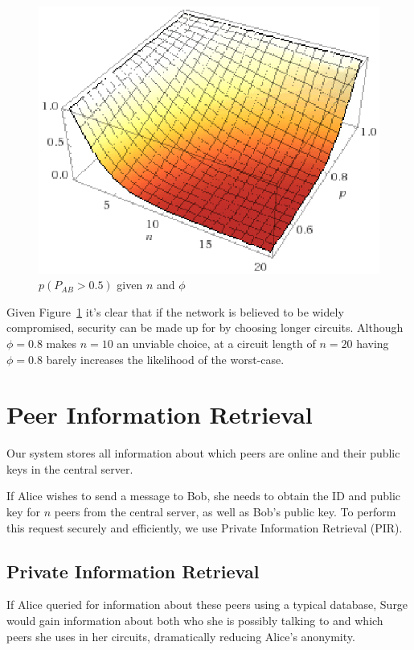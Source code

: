 \documentclass[twocolumn,11pt,english]{article}
\begin{document}
\begin{figure}[h]
\includegraphics*[width=\linewidth]{gamma5graph.eps}
\caption{$p(P_{AB} > 0.5)$ given $n$ and $\phi$}
\label{gamma5graph}
\end{figure}

Given Figure~\ref{gamma5graph} it's clear that if the network is believed to be widely compromised, security can be made up for by choosing longer circuits. Although $\phi = 0.8$ makes $n = 10$ an unviable choice, at a circuit length of $n=20$ having $\phi = 0.8$ barely increases the likelihood of the worst-case. 

\section{Peer Information Retrieval}
Our system stores all information about which peers are online and their public keys in the central server. 

If Alice wishes to send a message to Bob, she needs to obtain the ID and public key for $n$ peers from the central server, as well as Bob's public key. To perform this request securely and efficiently, we use Private Information Retrieval (PIR).


\subsection{Private Information Retrieval}
  If Alice queried for information about these peers using a typical database, Surge would gain information about both who she is possibly talking to and which peers she uses in her circuits, dramatically reducing Alice's anonymity. 
\end{document}
